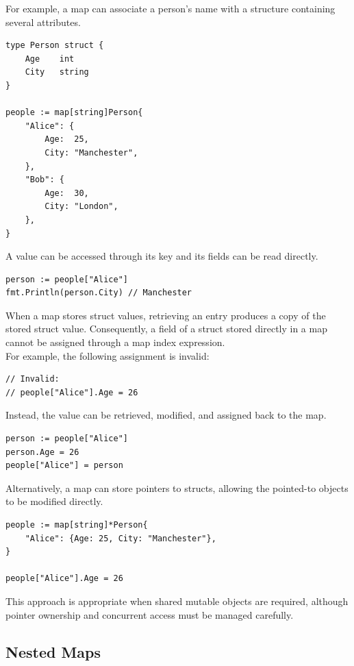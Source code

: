 For example, a map can associate a person's name with
a structure containing several attributes.

\begin{lstlisting}
type Person struct {
    Age    int
    City   string
}

people := map[string]Person{
    "Alice": {
        Age:  25,
        City: "Manchester",
    },
    "Bob": {
        Age:  30,
        City: "London",
    },
}
\end{lstlisting}

A value can be accessed through its key and its fields
can be read directly.

\begin{lstlisting}
person := people["Alice"]
fmt.Println(person.City) // Manchester
\end{lstlisting}

When a map stores struct values, retrieving an entry
produces a copy of the stored struct value. Consequently,
a field of a struct stored directly in a map cannot be
assigned through a map index expression.\\

For example, the following assignment is invalid:

\begin{lstlisting}
// Invalid:
// people["Alice"].Age = 26
\end{lstlisting}

Instead, the value can be retrieved, modified, and assigned
back to the map.

\begin{lstlisting}
person := people["Alice"]
person.Age = 26
people["Alice"] = person
\end{lstlisting}

Alternatively, a map can store pointers to structs, allowing
the pointed-to objects to be modified directly.

\begin{lstlisting}
people := map[string]*Person{
    "Alice": {Age: 25, City: "Manchester"},
}

people["Alice"].Age = 26
\end{lstlisting}

This approach is appropriate when shared mutable objects
are required, although pointer ownership and concurrent
access must be managed carefully.

\subsection{Nested Maps}

